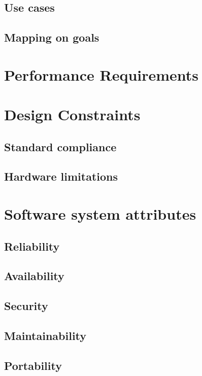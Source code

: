 \subsection{Use cases}
\label{subsec: use_cases}%

\subsection{Mapping on goals}
\label{subsec: map_on_g}%

\section{Performance Requirements}
\label{sec:performance_requirements}%

\section{Design Constraints}
\label{sec:performance_requirements}%

\subsection{Standard compliance}
\label{subsec: standard_compliance}%

\subsection{Hardware limitations}
\label{subsec: hardware_limitations}%

\section{Software system attributes}
\label{sec:performance_requirements}%

\subsection{Reliability}
\label{subsec: reliability}%

\subsection{Availability}
\label{subsec: availability}%

\subsection{Security}
\label{subsec: security }%

\subsection{Maintainability}
\label{subsec: maintainability}%

\subsection{Portability}
\label{subsec: portability}%
